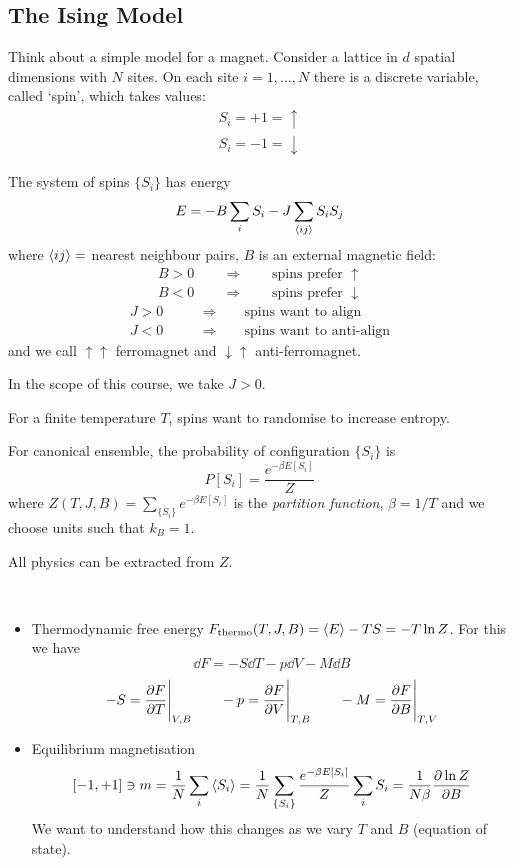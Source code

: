 \documentclass[a4paper,11pt]{article}
\begin{document}
	\subsection{The Ising Model}
	Think about a simple model for a magnet. Consider a lattice in $d$ spatial dimensions with $N$ sites. On each site $i = 1, \dots , N$ there is a discrete variable, called `spin', which takes values:
	\begin{align*}
		S_i = + 1 = \uparrow\\
		S_i = - 1 = \downarrow
	\end{align*}


	The system of spins $\{S_i\}$ has energy
	\[
		E = -B \sum_i S_i - J \sum_{\expval{ij}}S_i S_j
	\]
	where $\expval{ij} = $ nearest neighbour pairs, $B$ is an external magnetic field:
	\begin{align*}
		B>0 \qquad \Rightarrow\qquad \text{spins prefer }\uparrow\\
		B<0 \qquad \Rightarrow\qquad \text{spins prefer }\downarrow
	\end{align*}
	\begin{align*}
		J > 0 &\qquad \Rightarrow\qquad \text{spins want to align}\\
		J < 0 &\qquad \Rightarrow\qquad \text{spins want to anti-align}
	\end{align*}
	and we call $\uparrow\uparrow$ ferromagnet and $\downarrow\uparrow$ anti-ferromagnet.
	
	In the scope of this course, we take $J > 0$.

	For a finite temperature $T$, spins want to randomise to increase entropy.

	For canonical ensemble, the probability of configuration $\{S_i\}$ is 
	$$P[S_i] = \frac{e^{- \beta E[S_i]}}{Z}$$ 
	where $Z(T,J,B) = \sum_{\{S_i\}} e ^{-\beta E[S_i]}$ is the \emph{partition function}, $\beta = 1/T$ and we choose units such that $k_B = 1$.

	All physics can be extracted from $Z$.

	\begin{ex} \ 
		\begin{itemize}
			\item Thermodynamic free energy $F_{\text{thermo}}(T,J,B) = \expval{E} - TS = - T \ln Z$. For this we have 
			\[
				\dd{F} = -S \dd{T} - p \dd{V} - M \dd{B}
			\]
			\[
				-S = \pdv{F}{T}\Bigg|_{V,B} \qquad -p = \pdv{F}{V}\Bigg|_{T,B} \qquad - M = \pdv{F}{B}\Bigg|_{T,V}
			\]
			\item Equilibrium magnetisation \[
				[-1,+1] \ni m = \frac{1}{N}\sum_i \expval{S_i} = \frac{1}{N}\sum_{\{S_i\}} \frac{e^{-\beta E[S_i]}}{Z} \sum_i S_i = \frac{1}{N\beta} \pdv{\ln Z}{B}
			\]
			We want to understand how this changes as we vary $T$ and $B$ (equation of state).
		\end{itemize}
	\end{ex}
\end{document}
